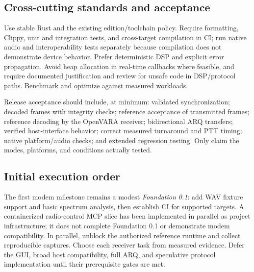 \documentclass[11pt,a4paper]{article}
\begin{document}
\subsection{Cross-cutting standards and acceptance}
Use stable Rust and the existing edition/toolchain policy. Require formatting,
Clippy, unit and integration tests, and cross-target compilation in CI; run
native audio and interoperability tests separately because compilation does
not demonstrate device behavior. Prefer deterministic DSP and explicit error
propagation. Avoid heap allocation in real-time callbacks where feasible, and
require documented justification and review for unsafe code in DSP/protocol
paths. Benchmark and optimize against measured workloads.

Release acceptance should include, at minimum: validated synchronization;
decoded frames with integrity checks; reference acceptance of transmitted
frames; reference decoding by the OpenVARA receiver; bidirectional ARQ
transfers; verified host-interface behavior; correct measured turnaround and
PTT timing; native platform/audio checks; and extended regression testing.
Only claim the modes, platforms, and conditions actually tested.

\subsection{Initial execution order}
The first modem milestone remains a modest \emph{Foundation 0.1}: add WAV
fixture support and basic spectrum analysis, then establish CI for supported
targets. A containerized radio-control MCP slice has been implemented in
parallel as project infrastructure; it does not complete Foundation 0.1 or
demonstrate modem compatibility. In parallel, unblock the authorized reference
runtime and collect reproducible captures. Choose each receiver task from
measured evidence. Defer the GUI, broad host compatibility, full ARQ, and
speculative protocol implementation until their prerequisite gates are met.
\end{document}
